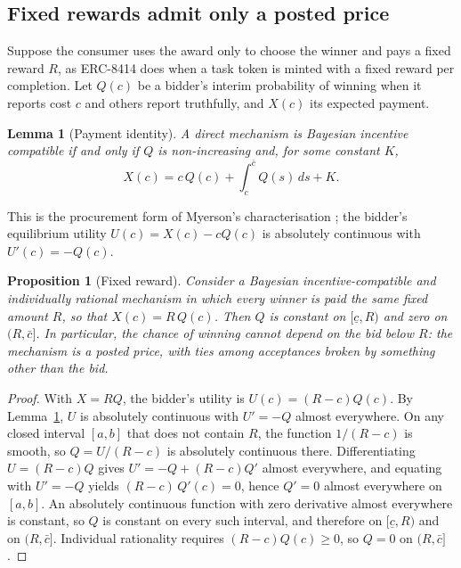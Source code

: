 \documentclass[11pt]{article}
\newtheorem{proposition}{Proposition}
\newtheorem{lemma}{Lemma}
\theoremstyle{definition}
\theoremstyle{remark}
\begin{document}
\subsection{Fixed rewards admit only a posted price}

Suppose the consumer uses the award only to choose the winner and pays a fixed reward $R$, as ERC-8414 does when a task token is minted with a fixed reward per completion. Let $Q(c)$ be a bidder's interim probability of winning when it reports cost $c$ and others report truthfully, and $X(c)$ its expected payment.

\begin{lemma}[Payment identity]
\label{lem:payment}
A direct mechanism is Bayesian incentive compatible if and only if $Q$ is non-increasing and, for some constant $K$,
\[
X(c) = c\,Q(c) + \int_c^{\bar{c}} Q(s)\,ds + K .
\]
\end{lemma}

This is the procurement form of Myerson's characterisation \citep{myerson1981}; the bidder's equilibrium utility $U(c) = X(c) - cQ(c)$ is absolutely continuous with $U'(c) = -Q(c)$.

\begin{proposition}[Fixed reward]
\label{prop:fixed}
Consider a Bayesian incentive-compatible and individually rational mechanism in which every winner is paid the same fixed amount $R$, so that $X(c) = R\,Q(c)$. Then $Q$ is constant on $[\underline{c}, R)$ and zero on $(R, \bar{c}]$. In particular, the chance of winning cannot depend on the bid below $R$: the mechanism is a posted price, with ties among acceptances broken by something other than the bid.
\end{proposition}

\begin{proof}
With $X = RQ$, the bidder's utility is $U(c) = (R - c)Q(c)$. By Lemma~\ref{lem:payment}, $U$ is absolutely continuous with $U' = -Q$ almost everywhere. On any closed interval $[a, b]$ that does not contain $R$, the function $1/(R - c)$ is smooth, so $Q = U/(R - c)$ is absolutely continuous there. Differentiating $U = (R - c)Q$ gives $U' = -Q + (R - c)Q'$ almost everywhere, and equating with $U' = -Q$ yields $(R - c)\,Q'(c) = 0$, hence $Q' = 0$ almost everywhere on $[a, b]$. An absolutely continuous function with zero derivative almost everywhere is constant, so $Q$ is constant on every such interval, and therefore on $[\underline{c}, R)$ and on $(R, \bar{c}]$. Individual rationality requires $(R - c)Q(c) \ge 0$, so $Q = 0$ on $(R, \bar{c}]$.
\end{proof}
\end{document}
